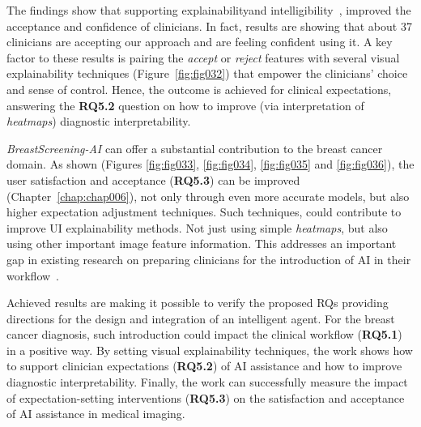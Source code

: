 The findings show that supporting explainability\footnotemark[34] and intelligibility\footnotemark[35]~\cite{10.1145/3173574.3174156}, improved the acceptance and confidence of clinicians.
In fact, results are showing that about 37 clinicians are accepting our approach and are feeling confident using it.
A key factor to these results is pairing the {\it accept} or {\it reject} features with several visual explainability techniques (Figure~\ref{fig:fig032}) that empower the clinicians' choice and sense of control.
Hence, the outcome is achieved for clinical expectations, answering the {\bf RQ5.2} question on how to improve (via interpretation of {\it heatmaps}) diagnostic interpretability.



{\it BreastScreening-AI} can offer a substantial contribution to the breast cancer domain.
As shown (Figures \ref{fig:fig033}, \ref{fig:fig034}, \ref{fig:fig035} and \ref{fig:fig036}), the user satisfaction and acceptance ({\bf RQ5.3}) can be improved (Chapter~\ref{chap:chap006}), not only through even more accurate models, but also higher expectation adjustment techniques.
Such techniques, could contribute to improve \ac{UI} explainability methods.
Not just using simple {\it heatmaps}, but also using other important image feature information.
This addresses an important gap in existing research on preparing clinicians for the introduction of \ac{AI} in their workflow~\cite{Alkhatib:2019:SAT:3290605.3300760, challen2019artificial, shah2019artificial, szolovits2019artificial}.

Achieved results are making it possible to verify the proposed RQs providing directions for the design and integration of an intelligent agent.
For the breast cancer diagnosis, such introduction could impact the clinical workflow ({\bf RQ5.1}) in a positive way.
By setting visual explainability techniques, the work shows how to support clinician expectations ({\bf RQ5.2}) of \ac{AI} assistance and how to improve diagnostic interpretability.
Finally, the work can successfully measure the impact of expectation-setting interventions ({\bf RQ5.3}) on the satisfaction and acceptance of \ac{AI} assistance in medical imaging.

